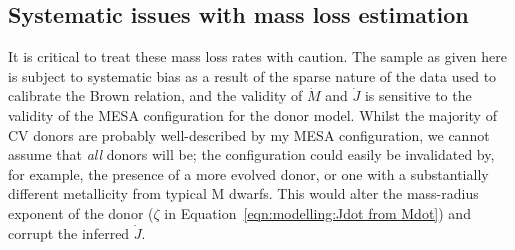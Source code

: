 \subsection{Systematic issues with mass loss estimation}
\label{sect:massloss and AML:systematic bias}

It is critical to treat these mass loss rates with caution.
The sample as given here is subject to systematic bias as a result of the sparse nature of the data used to calibrate the Brown relation, and the validity of $\dot M$ and $\dot J$ is sensitive to the validity of the MESA configuration for the donor model.
Whilst the majority of CV donors are probably well-described by my MESA configuration, we cannot assume that \textit{all} donors will be; the configuration could easily be invalidated by, for example, the presence of a more evolved donor, or one with a substantially different metallicity from typical M dwarfs.
This would alter the mass-radius exponent of the donor ($\zeta$ in Equation~\ref{eqn:modelling:Jdot from Mdot}) and corrupt the inferred $\dot J$.

